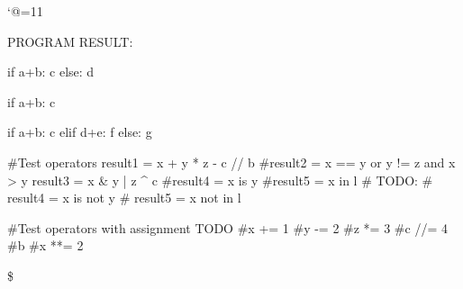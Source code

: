 \let\e\expandafter
\catcode`@=11








\def\@pytexChar@Backslash{\loggingall\@pytexParser@parse}
\let\@pytexChar@Dollar\bye

%

PROGRAM RESULT:

\@pytexCatcodes@setallactive


if a+b:
	c
else:
	d

if a+b:
	c

if a+b:
	c
elif d+e:
	f
else:
	g

#Test operators
result1 = x + y * z - c // b %
#result2 = x == y or y != z and x > y
result3 = x & y | z ^ c
#result4 = x is y
#result5 = x in l
# TODO:
# result4 = x is not y
# result5 = x not in l

#Test operators with assignment TODO
#x += 1
#y -= 2
#z *= 3
#c //= 4
#b %
#x **= 2






\$
\bye
